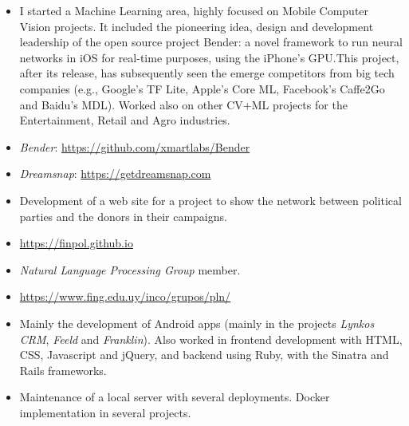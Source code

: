 \documentclass[10pt,a4paper,academicons]{altacv}
\begin{document}
\begin{itemize}
  \item I started a Machine Learning area, highly focused on Mobile Computer Vision projects. It included the pioneering idea, design and development leadership of the open source project Bender: a novel framework to run neural networks in iOS for real-time purposes, using the iPhone’s GPU.\@ This project, after its release, has subsequently seen the emerge competitors from big tech companies (e.g., Google’s TF Lite, Apple’s Core ML, Facebook’s Caffe2Go and Baidu’s MDL). Worked also on other CV+ML projects for the Entertainment, Retail and Agro industries.
  \item \emph{Bender}: \url{https://github.com/xmartlabs/Bender}
  \item \emph{Dreamsnap}: \url{https://getdreamsnap.com}
\end{itemize}

\divider{}


\begin{itemize}
  \item Development of a web site for a project to show the network between political parties and the donors in their campaigns.
  \item \url{https://finpol.github.io}
\end{itemize}

\pagebreak



\begin{itemize}
  \item \emph{Natural Language Processing Group} member.
  \item \url{https://www.fing.edu.uy/inco/grupos/pln/}
\end{itemize}

\divider{}


\begin{itemize}
  \item Mainly the development of Android apps (mainly in the projects \emph{Lynkos CRM}, \emph{Feeld} and \emph{Franklin}). Also worked in frontend development with HTML, CSS, Javascript and jQuery, and backend using Ruby, with the Sinatra and Rails frameworks.
  \item Maintenance of a local server with several deployments. Docker implementation in several projects.
\end{itemize}
\end{document}
